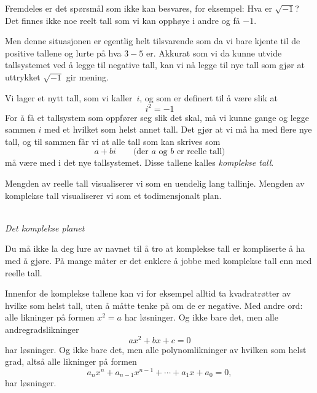 Fremdeles er det spørsmål som ikke kan besvares, for eksempel: Hva er
$\sqrt{-1}$?  Det finnes ikke noe reelt tall som vi kan opphøye i
andre og få $-1$.

Men denne situasjonen er egentlig helt tilsvarende som da vi bare
kjente til de positive tallene og lurte på hva $3 - 5$ er.  Akkurat
som vi da kunne utvide tallsystemet ved å legge til negative tall, kan
vi nå legge til nye tall som gjør at uttrykket $\sqrt{-1}$ gir mening.

Vi lager et nytt tall, som vi kaller~$i$, og som er definert til å
være slik at
\[
i^2 = -1
\]
For å få et tallsystem som oppfører seg slik det skal, må vi kunne
gange og legge sammen $i$ med et hvilket som helst annet tall.  Det
gjør at vi må ha med flere nye tall, og til sammen får vi at alle tall
som kan skrives som
\[
a + bi
\qquad
\text{(der $a$ og~$b$ er reelle tall)}
\]
må være med i det nye tallsystemet.  Disse tallene kalles
\emph{komplekse tall}.

Mengden av reelle tall visualiserer vi som en uendelig lang tallinje.
Mengden av komplekse tall visualiserer vi som et todimensjonalt plan.
\begin{center}
\\
{\small \textit{Det komplekse planet}}
\end{center}

Du må ikke la deg lure av navnet til å tro at komplekse tall er
kompliserte å ha med å gjøre.  På mange måter er det enklere å jobbe
med komplekse tall enn med reelle tall.

Innenfor de komplekse tallene kan vi for eksempel alltid ta
kvadratrøtter av hvilke som helst tall, uten å måtte tenke på om de er
negative.  Med andre ord: alle likninger på formen $x^2 = a$ har
løsninger.  Og ikke bare det, men alle andregradslikninger
\[
a x^2 + bx + c = 0
\]
har løsninger.  Og ikke bare det, men alle polynomlikninger av hvilken
som helst grad, altså alle likninger på formen
\[
a_n x^n + a_{n-1} x^{n-1} + \cdots + a_1 x + a_0 = 0,
\]
har løsninger.

